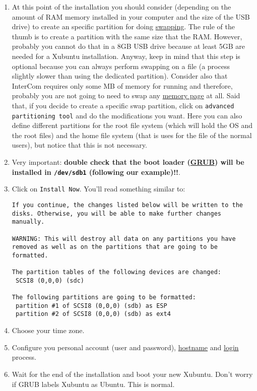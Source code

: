 \begin{enumerate}
\item At this point of the installation you should consider (depending
  on the amount of RAM memory installed in your computer and the size
  of the USB drive) to create an specific partition for doing
  \href{https://en.wikipedia.org/wiki/Swapping}{swapping}. The rule of
  the thumb is to create a partition with the same size that the
  RAM. However, probably you cannot do that in a 8GB USB drive because
  at least 5GB are needed for a Xubuntu installation. Anyway, keep in
  mind that this step is optional because you can always perform
  swapping on a file (a process slightly slower than using the
  dedicated partition). Consider also that InterCom requires only some
  MB of memory for running and therefore, probably you are not going
  to need to swap any
  \href{https://en.wikipedia.org/wiki/Page_(computer_memory)}{memory
    page} at all. Said that, if you decide to create a specific swap
  partition, click on \verb|advanced partitioning tool| and do the
  modifications you want. Here you can also define different
  partitions for the root file system (which will hold the OS and the
  root files) and the home file system (that is uses for the file of
  the normal users), but notice that this is not necessary.

\item Very important: \textbf{double check that the boot loader
  (\href{https://www.gnu.org/software/grub/}{GRUB}) will be installed
  in \texttt{/dev/sdb1} (following our example)!!}.

\item Click on \verb|Install Now|. You'll read something similar to:

\begin{verbatim}
If you continue, the changes listed below will be written to the disks. Otherwise, you will be able to make further changes manually.

WARNING: This will destroy all data on any partitions you have removed as well as on the partitions that are going to be formatted.

The partition tables of the following devices are changed:
 SCSI8 (0,0,0) (sdc)

The following partitions are going to be formatted:
 partition #1 of SCSI8 (0,0,0) (sdb) as ESP
 partition #2 of SCSI8 (0,0,0) (sdb) as ext4
\end{verbatim}

\item Choose your time zone.
  
\item Configure you personal account (user and password),
  \href{https://en.wikipedia.org/wiki/Hostname}{hostname} and
  \href{https://en.wikipedia.org/wiki/Login}{login} process.
  
\item Wait for the end of the installation and boot your new
  Xubuntu. Don't worry if GRUB labels Xubuntu as Ubuntu. This is
  normal.
  
\end{enumerate}

